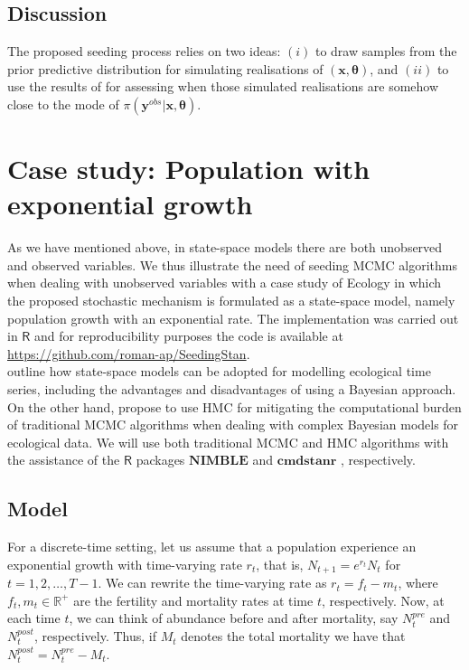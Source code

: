 \documentclass[12pt,a4paper]{article}
\begin{document}
\subsection{Discussion}

The proposed seeding process relies on two ideas: $\mathit{(i)}$ to draw samples from the prior predictive distribution for simulating realisations of $(\mathbf{x}, \boldsymbol{\theta})$, and $\mathit{(ii)}$ to use the results of \cite{Maa&etal1996} for assessing when those simulated realisations are somehow close to the mode of $\pi(\mathbf{y}^{obs} \vert \mathbf{x}, \boldsymbol{\theta})$.


\section{Case study: Population with exponential growth}
\label{sec:sim}

As we have mentioned above, in state-space models there are both unobserved and observed variables. We thus illustrate the need of seeding MCMC algorithms when dealing with unobserved variables with a case study of Ecology in which the proposed stochastic mechanism is formulated as a state-space model, namely population growth with an exponential rate. The implementation was carried out in $\mathsf{R}$ \citep{R2026} and for reproducibility purposes the code is available at \url{https://github.com/roman-ap/SeedingStan}.\\

\citet{AugerMethe2021} outline how state-space models can be adopted for modelling ecological time series, including the advantages and disadvantages of using a Bayesian approach. On the other hand, \citet{Monnahan2017} propose to use HMC for mitigating the computational burden of traditional MCMC algorithms when dealing with complex Bayesian models for ecological data. We will use both traditional MCMC and HMC algorithms with the assistance of the $\mathsf{R}$ packages $\mathbf{NIMBLE}$ \citep{NIMBLE} and $\mathbf{cmdstanr}$ \citep{cmdstanr}, respectively.

\subsection{Model}  

For a discrete-time setting, let us assume that a population experience an exponential growth with time-varying rate $r_{t}$, that is, $N_{t+1}=e^{r_{t}}N_{t}$ for $t=1,2,\ldots,T-1$. We can rewrite the time-varying rate as $r_{t}=f_{t}-m_{t}$, where $f_{t},m_{t}\in\mathbb{R}^{+}$ are the fertility and mortality rates at time $t$, respectively. Now, at each time $t$, we can think of abundance before and after mortality, say $N^{pre}_{t}$ and $N^{post}_{t}$, respectively. Thus, if $M_{t}$ denotes the total mortality we have that $N_{t}^{post}=N_{t}^{pre} - M_{t}$.\\
\end{document}

